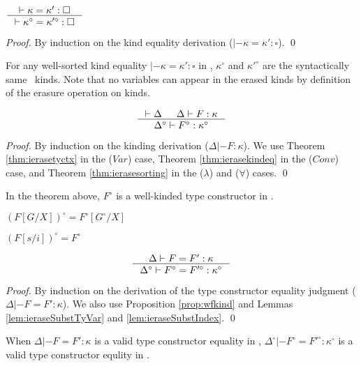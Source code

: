 \begin{theorem}\label{thm:ierasekindeq}
$ \inference{|- \kappa=\kappa':\square}
        {|- \kappa^\circ=\kappa'^\circ:\square}
$
\end{theorem}
\begin{proof}
        By induction on the kind equality derivation
        ($|- \kappa=\kappa':\square$).
        \qed
\end{proof}
\begin{remark}
For any well-sorted kind equality $|- \kappa=\kappa':\square$ in \Fi,
$\kappa^\circ$ and $\kappa'^\circ$ are the syntactically same \Fw\ kinds.
Note that no variables can appear in the erased kinds by definition of
the erasure operation on kinds.
\end{remark}

\begin{theorem}
\label{thm:ierasekinding}
\[ \inference{|- \Delta & \Delta |- F : \kappa}
                {\Delta^\circ |- F^\circ : \kappa^\circ}
\]
\end{theorem}
\begin{proof}
        By induction on the kinding derivation ($\Delta |- F : \kappa$).
        We use Theorem \ref{thm:ierasetyctx} in the ($Var$) case,
        Theorem \ref{thm:ierasekindeq} in the ($Conv$) case, and
        Theorem \ref{thm:ierasesorting} in the ($\lambda$) and ($\forall$) cases.
        \qed
\end{proof}
\begin{remark} In the theorem above, $F^\circ$ is a well-kinded type constructor in \Fw.
\end{remark}

\noindent
\begin{minipage}{.55\linewidth}
\begin{lemma}\label{lem:ieraseSubstTyVar}
$(F[G/X])^\circ = F^\circ[G^\circ/X]$
\end{lemma}
\end{minipage}
\begin{minipage}{.4\linewidth}
\begin{lemma}\label{lem:ieraseSubstIndex}
$(F[s/i])^\circ = F^\circ$
\end{lemma}
\end{minipage}
\begin{theorem}
\label{thm:ierasetyconeq}
\[ \inference{\Delta |- F=F':\kappa}
                {\Delta^\circ |- F^\circ=F'^\circ:\kappa^\circ}
\]
\end{theorem}
\begin{proof}
        By induction on the derivation of the type constructor equality judgment
        ($\Delta |- F=F':\kappa$). We also use Proposition \ref{prop:wfkind}
        and Lemmas \ref{lem:ieraseSubstTyVar} and \ref{lem:ieraseSubstIndex}.
        \qed
\end{proof}
\begin{remark}
When $\Delta |- F=F':\kappa$ is a valid type constructor equality in \Fi,
$\Delta^\circ |- F^\circ=F'^\circ:\kappa^\circ$
is a valid type constructor equlity in \Fw.
\end{remark}

